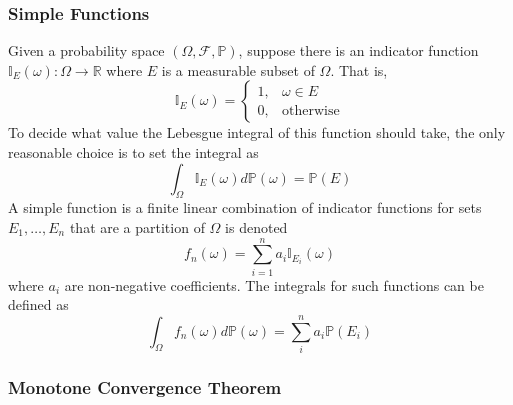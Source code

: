 \documentclass[11pt]{report} %
\begin{document}
\subsubsection{Simple Functions}

Given a probability space $\left(\Omega, \mathcal{F}, \mathbb{P}\right)$, suppose there is an indicator function $\mathbb{I}_{E}\left(\omega\right): \Omega \to \mathbb{R}$ where $E$ is a measurable subset of $\Omega$. That is,
\begin{equation}
\mathbb{I}_{E}\left(\omega\right) = \begin{cases} 1, & \omega \in E \\ 0, & \mathrm{otherwise}\end{cases}
\end{equation}
To decide what value the Lebesgue integral of this function should take, the only reasonable choice is to set the integral as
\begin{equation}
\int_{\Omega}\mathbb{I}_{E}\left(\omega\right)d\mathbb{P}\left(\omega\right) = \mathbb{P}\left(E\right)
\end{equation}
A simple function is a finite linear combination of indicator functions for sets $E_{1}, \dots, E_{n}$ that are a partition of $\Omega$ is denoted
\begin{equation}
f_{n}\left(\omega\right) = \sum_{i = 1}^{n}a_{i}\mathbb{I}_{E_{i}}\left(\omega\right)
\end{equation}
where $a_{i}$ are non-negative coefficients. The integrals for such functions can be defined as
\begin{equation}
\int_{\Omega}f_{n}\left(\omega\right)d\mathbb{P}\left(\omega\right) = \sum_{i}^{n}a_{i}\mathbb{P}\left(E_{i}\right)
\end{equation}

\subsubsection{Monotone Convergence Theorem}
\end{document}
